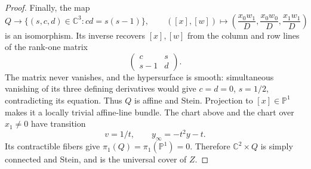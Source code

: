 \begin{proof}
Finally, the map
\[
 Q\longrightarrow\{(s,c,d)\in\mathbb C^3:cd=s(s-1)\},
 \qquad ([x],[w])\longmapsto
 \left(\frac{x_0w_1}{D},\frac{x_0w_0}{D},\frac{x_1w_1}{D}\right)
\]
is an isomorphism. Its inverse recovers $[x],[w]$ from the column and row lines of the rank-one matrix
\[
 \begin{pmatrix}c&s\\s-1&d\end{pmatrix}.
\]
The matrix never vanishes, and the hypersurface is smooth: simultaneous vanishing of its three defining derivatives would give $c=d=0$, $s=1/2$, contradicting its equation. Thus $Q$ is affine and Stein. Projection to $[x]\in\mathbb P^1$ makes it a locally trivial affine-line bundle. The chart above and the chart over $x_1\ne0$ have transition
\[
 v=1/t,\qquad y_\infty=-t^2y-t.
\]
Its contractible fibers give $\pi_1(Q)=\pi_1(\mathbb P^1)=0$. Therefore $\mathbb C^2\times Q$ is simply connected and Stein, and is the universal cover of $Z$.
\end{proof}
